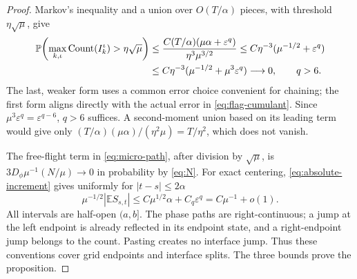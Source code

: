 \documentclass[11pt]{article}
\newcommand{\E}{\mathbb E}
\newcommand{\Prob}{\mathbb P}
\newcommand{\eps}{\varepsilon}
\newcommand{\Count}{\operatorname{Count}}
\theoremstyle{definition}\newtheorem{definition}[theorem]{Definition}
\theoremstyle{remark}\newtheorem{remark}[theorem]{Remark}
\numberwithin{equation}{section}
\begin{document}
\begin{proof}
Markov's inequality and a union over $O(T/\alpha)$ pieces, with threshold
$\eta\sqrt\mu$, give
\begin{align}
 \Prob\!\left(\max_{k,\iota}\Count(I_k^\iota)>\eta\sqrt\mu\right)
 &\le\frac{C(T/\alpha)(\mu\alpha+\eps^q)}{\eta^3\mu^{3/2}}
 \le C\eta^{-3}(\mu^{-1/2}+\eps^q)\notag\\
 &\le C\eta^{-3}(\mu^{-1/2}+\mu^3\eps^q)\longrightarrow0,
               \qquad q>6.\label{eq:micro-union}
\end{align}
The last, weaker form uses a common error choice convenient for chaining;
the first form aligns directly with the actual error in
\eqref{eq:flag-cumulant}. Since $\mu^3\eps^q=\eps^{q-6}$, $q>6$ suffices.
A second-moment union based on its leading term would give only
$(T/\alpha)(\mu\alpha)/(\eta^2\mu)=T/\eta^2$, which does not vanish.

The free-flight term in \eqref{eq:micro-path}, after division by
$\sqrt\mu$, is
$3D_\phi\mu^{-1}(N/\mu)\to0$ in probability by \eqref{eq:N}.
For exact centering, \eqref{eq:absolute-increment} gives uniformly for
$|t-s|\le2\alpha$
\[
 \mu^{-1/2}|\E S_{s,t}|\le C\mu^{1/2}\alpha+C_q\eps^q
                   =C\mu^{-1}+o(1).
\]
All intervals are half-open $(a,b]$. The phase paths are right-continuous;
a jump at the left endpoint is already reflected in its endpoint state,
and a right-endpoint jump belongs to the count. Pasting creates no interface
jump. Thus these conventions cover grid endpoints and interface splits.
The three bounds prove the proposition.
\end{proof}
\end{document}

